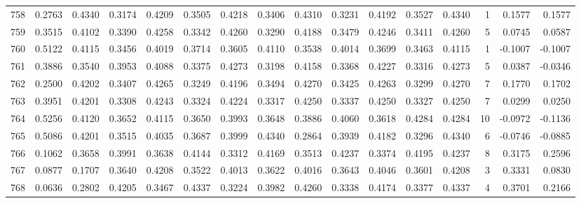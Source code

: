 \begin{tabular}{lrrrrrrrrrrrrrrr}
758 &      0.2763 &  0.4340 &  0.3174 &  0.4209 &  0.3505 &  0.4218 &  0.3406 &  0.4310 &  0.3231 &  0.4192 &   0.3527 &     0.4340 &      1 &                    0.1577 &                     0.1577 \\
759 &      0.3515 &  0.4102 &  0.3390 &  0.4258 &  0.3342 &  0.4260 &  0.3290 &  0.4188 &  0.3479 &  0.4246 &   0.3411 &     0.4260 &      5 &                    0.0745 &                     0.0587 \\
760 &      0.5122 &  0.4115 &  0.3456 &  0.4019 &  0.3714 &  0.3605 &  0.4110 &  0.3538 &  0.4014 &  0.3699 &   0.3463 &     0.4115 &      1 &                   -0.1007 &                    -0.1007 \\
761 &      0.3886 &  0.3540 &  0.3953 &  0.4088 &  0.3375 &  0.4273 &  0.3198 &  0.4158 &  0.3368 &  0.4227 &   0.3316 &     0.4273 &      5 &                    0.0387 &                    -0.0346 \\
762 &      0.2500 &  0.4202 &  0.3407 &  0.4265 &  0.3249 &  0.4196 &  0.3494 &  0.4270 &  0.3425 &  0.4263 &   0.3299 &     0.4270 &      7 &                    0.1770 &                     0.1702 \\
763 &      0.3951 &  0.4201 &  0.3308 &  0.4243 &  0.3324 &  0.4224 &  0.3317 &  0.4250 &  0.3337 &  0.4250 &   0.3327 &     0.4250 &      7 &                    0.0299 &                     0.0250 \\
764 &      0.5256 &  0.4120 &  0.3652 &  0.4115 &  0.3650 &  0.3993 &  0.3648 &  0.3886 &  0.4060 &  0.3618 &   0.4284 &     0.4284 &     10 &                   -0.0972 &                    -0.1136 \\
765 &      0.5086 &  0.4201 &  0.3515 &  0.4035 &  0.3687 &  0.3999 &  0.4340 &  0.2864 &  0.3939 &  0.4182 &   0.3296 &     0.4340 &      6 &                   -0.0746 &                    -0.0885 \\
766 &      0.1062 &  0.3658 &  0.3991 &  0.3638 &  0.4144 &  0.3312 &  0.4169 &  0.3513 &  0.4237 &  0.3374 &   0.4195 &     0.4237 &      8 &                    0.3175 &                     0.2596 \\
767 &      0.0877 &  0.1707 &  0.3640 &  0.4208 &  0.3522 &  0.4013 &  0.3622 &  0.4016 &  0.3643 &  0.4046 &   0.3601 &     0.4208 &      3 &                    0.3331 &                     0.0830 \\
768 &      0.0636 &  0.2802 &  0.4205 &  0.3467 &  0.4337 &  0.3224 &  0.3982 &  0.4260 &  0.3338 &  0.4174 &   0.3377 &     0.4337 &      4 &                    0.3701 &                     0.2166 \\

\end{tabular}
